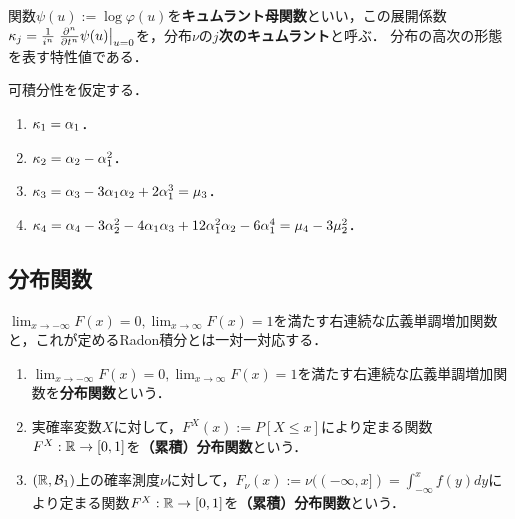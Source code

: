 \documentclass[uplatex,dvipdfmx]{jsreport}
\begin{document}
\begin{definition}[cuumulant]
    関数$\psi(u):=\log\varphi(u)$を\textbf{キュムラント母関数}といい，この展開係数$\kappa_j=\frac{1}{i^n}\left.\frac{\partial ^n}{\partial t^n}\psi(u)\right|_{u=0}$を，分布$\nu$の\textbf{$j$次のキュムラント}と呼ぶ．
    分布の高次の形態を表す特性値である．
\end{definition}

\begin{proposition}[キュムラントの積率による表現]
    可積分性を仮定する．
    \begin{enumerate}
        \item $\kappa_1=\alpha_1$．
        \item $\kappa_2=\alpha_2-\alpha_1^2$．
        \item $\kappa_3=\alpha_3-3\alpha_1\alpha_2+2\alpha_1^3=\mu_3$．
        \item $\kappa_4=\alpha_4-3\alpha_2^2-4\alpha_1\alpha_3+12\alpha_1^2\alpha_2-6\alpha_1^4=\mu_4-3\mu_2^2$．
    \end{enumerate}
\end{proposition}

\subsection{分布関数}

\begin{tcolorbox}[colframe=ForestGreen, colback=ForestGreen!10!white,breakable,colbacktitle=ForestGreen!40!white,coltitle=black,fonttitle=\bfseries\sffamily,
title=]
$\lim_{x\to-\infty}F(x)=0,\lim_{x\to\infty}F(x)=1$を満たす右連続な広義単調増加関数と，これが定めるRadon積分とは一対一対応する．
\end{tcolorbox}

\begin{definition}\mbox{}
    \begin{enumerate}
        \item $\lim_{x\to-\infty}F(x)=0,\lim_{x\to\infty}F(x)=1$を満たす右連続な広義単調増加関数を\textbf{分布関数}という．
        \item 実確率変数$X$に対して，$F^X(x):=P[X\le x]$により定まる関数$F^X:\mathbb{R}\to[0,1]$を\textbf{（累積）分布関数}という．
        \item $(\mathbb{R},\mathcal{B}_1)$上の確率測度$\nu$に対して，$F_\nu(x):=\nu((-\infty,x])=\int^x_{-\infty}f(y)dy$により定まる関数$F^X:\mathbb{R}\to[0,1]$を\textbf{（累積）分布関数}という．
    \end{enumerate}
\end{definition}
\end{document}
